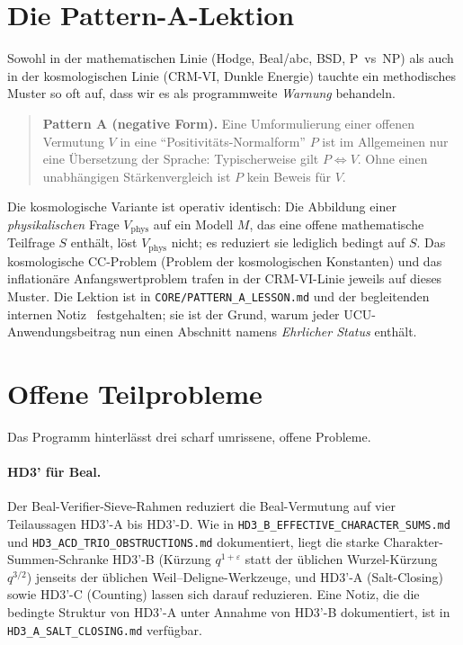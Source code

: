 \documentclass[11pt,a4paper]{article}
\theoremstyle{remark}
\begin{document}
\section{Die Pattern-A-Lektion}
\label{sec:pattern-a}

Sowohl in der mathematischen Linie (Hodge, Beal/abc, BSD, P~vs~NP) als auch in der kosmologischen Linie (CRM-VI, Dunkle Energie) tauchte ein methodisches Muster so oft auf, dass wir es als programmweite \emph{Warnung} behandeln.

\begin{quote}
\textbf{Pattern A (negative Form).}
Eine Umformulierung einer offenen Vermutung $V$ in eine ``Positivitäts-Normalform'' $P$ ist im Allgemeinen nur eine Übersetzung der Sprache: Typischerweise gilt $P \Leftrightarrow V$. Ohne einen unabhängigen Stärkenvergleich ist $P$ kein Beweis für $V$.
\end{quote}

\noindent Die kosmologische Variante ist operativ identisch: Die Abbildung einer \emph{physikalischen} Frage $V_{\text{phys}}$ auf ein Modell $M$, das eine offene mathematische Teilfrage $S$ enthält, löst $V_{\text{phys}}$ nicht; es reduziert sie lediglich bedingt auf $S$. Das kosmologische CC-Problem (Problem der kosmologischen Konstanten) und das inflationäre Anfangswertproblem trafen in der CRM-VI-Linie jeweils auf dieses Muster. Die Lektion ist in \texttt{CORE/PATTERN\_A\_LESSON.md} und der begleitenden internen Notiz~\cite{FST-Unified2026} festgehalten; sie ist der Grund, warum jeder UCU-Anwendungsbeitrag nun einen Abschnitt namens \emph{Ehrlicher Status} enthält.

\section{Offene Teilprobleme}
\label{sec:open}

Das Programm hinterlässt drei scharf umrissene, offene Probleme.

\paragraph{HD3' für Beal.}
Der Beal-Verifier-Sieve-Rahmen reduziert die Beal-Vermutung auf vier Teilaussagen HD3'-A bis HD3'-D. Wie in \texttt{HD3\_B\_EFFECTIVE\_CHARACTER\_SUMS.md} und \texttt{HD3\_ACD\_TRIO\_OBSTRUCTIONS.md} dokumentiert, liegt die starke Charakter-Summen-Schranke HD3'-B (Kürzung $q^{1+\varepsilon}$ statt der üblichen Wurzel-Kürzung $q^{3/2}$) jenseits der üblichen Weil--Deligne-Werkzeuge, und HD3'-A (Salt-Closing) sowie HD3'-C (Counting) lassen sich darauf reduzieren. Eine Notiz, die die bedingte Struktur von HD3'-A unter Annahme von HD3'-B dokumentiert, ist in \texttt{HD3\_A\_SALT\_CLOSING.md} verfügbar.
\end{document}
